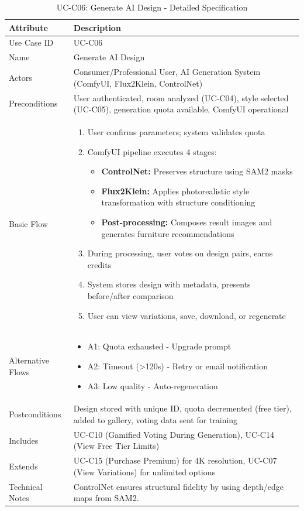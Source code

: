 \begin{table}[h]
\centering
\caption{UC-C06: Generate AI Design - Detailed Specification}
\label{tab:uc_generate_detail}
\begin{tabular}{p{3cm}p{11cm}}
\toprule
\textbf{Attribute} & \textbf{Description} \\
\midrule
Use Case ID & UC-C06 \\
\midrule
Name & Generate AI Design \\
\midrule
Actors & Consumer/Professional User, AI Generation System (ComfyUI, Flux2Klein, ControlNet) \\
\midrule
Preconditions & User authenticated, room analyzed (UC-C04), style selected (UC-C05), generation quota available, ComfyUI operational \\
\midrule
Basic Flow &
\begin{enumerate}[leftmargin=*,noitemsep,topsep=0pt]
    \item User confirms parameters; system validates quota
    \item ComfyUI pipeline executes 4 stages:
    \begin{itemize}[noitemsep,topsep=0pt]
        \item \textbf{ControlNet:} Preserves structure using SAM2 masks
        \item \textbf{Flux2Klein:} Applies photorealistic style transformation with structure conditioning
        \item \textbf{Post-processing:} Composes result images and generates furniture recommendations
    \end{itemize}
    \item During processing, user votes on design pairs, earns credits
    \item System stores design with metadata, presents before/after comparison
    \item User can view variations, save, download, or regenerate
\end{enumerate} \\
\midrule
Alternative Flows &
\begin{itemize}[leftmargin=*,noitemsep,topsep=0pt]
    \item A1: Quota exhausted - Upgrade prompt
    \item A2: Timeout (>120s) - Retry or email notification
    \item A3: Low quality - Auto-regeneration
\end{itemize} \\
\midrule
Postconditions & Design stored with unique ID, quota decremented (free tier), added to gallery, voting data sent for training \\
\midrule
Includes & UC-C10 (Gamified Voting During Generation), UC-C14 (View Free Tier Limits) \\
\midrule
Extends & UC-C15 (Purchase Premium) for 4K resolution, UC-C07 (View Variations) for unlimited options \\
\midrule
Technical Notes & 
ControlNet ensures structural fidelity by using depth/edge maps from SAM2. \\
\bottomrule
\end{tabular}
\end{table}

